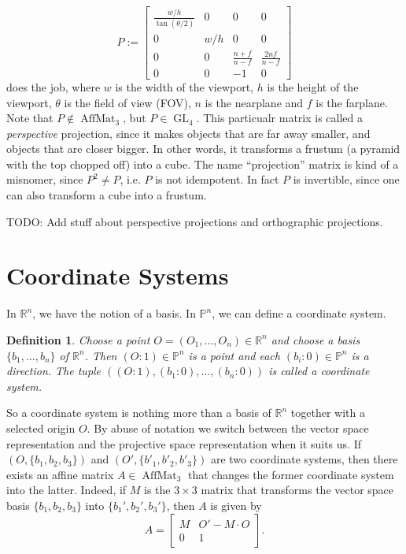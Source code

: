 \documentclass{article}
\newtheorem{definition}{Definition}
\DeclareMathOperator{\AffMat}{AffMat}
\DeclareMathOperator{\GL}{GL}
\begin{document}


\[ P := \begin{bmatrix} 
\frac{w/h}{\tan(\theta / 2)} & 0 & 0 & 0 \\
0 & w/h & 0 & 0 \\
0 & 0 & \frac{n+f}{n-f} & \frac{2nf}{n-f} \\
0 & 0 & -1 & 0  
 \end{bmatrix} \]
does the job, where $w$ is the width of the viewport, $h$ is the height of the viewport, $\theta$ is the field of view (FOV), $n$ is the nearplane and $f$ is the farplane. Note that $P \not\in \AffMat_3$, but $P \in \GL_4$. This particualr matrix is called a \emph{perspective} projection, since it makes objects that are far away smaller, and objects that are closer bigger. In other words, it transforms a frustum (a pyramid with the top chopped off) into a cube. The name ``projection'' matrix is kind of a misnomer, since $P^2 \neq P$, i.e. $P$ is not idempotent. In fact $P$ is invertible, since one can also transform a cube into a frustum.

TODO: Add stuff about perspective projections and orthographic projections.

\section{Coordinate Systems}

In $\mathbb{R}^n$, we have the notion of a basis. In $\mathbb{P}^n$, we can define a coordinate system.
\begin{definition}
Choose a point $O = (O_1,\ldots,O_n) \in \mathbb{R}^n$ and choose a basis $\{b_1,\ldots,b_n\}$ of $\mathbb{R}^n$. Then $(O : 1) \in \mathbb{P}^n$ is a point and each $(b_i : 0) \in \mathbb{P}^n$ is a direction. The tuple $((O : 1), (b_1 : 0), \ldots, (b_n : 0))$ is called a \emph{coordinate system}.
\end{definition}
So a coordinate system is nothing more than a basis of $\mathbb{R}^n$ together with a selected origin $O$. By abuse of notation we switch between the vector space representation and the projective space representation when it suits us. If $\left(O, \{b_1,b_2,b_3\}\right)$ and $\left(O', \{b'_1, b'_2, b'_3\} \right)$ are two coordinate systems, then there exists an affine matrix $A \in \AffMat_3$ that changes the former coordinate system into the latter. Indeed, if $M$ is the $3 \times 3$ matrix that transforms the vector space basis $\{b_1,b_2,b_3\}$ into $\{b_1',b_2',b_3'\}$, then $A$ is given by
\[ A = \begin{bmatrix} M & O'-M\cdot O \\ 0 & 1 \end{bmatrix}. \]
\end{document}
